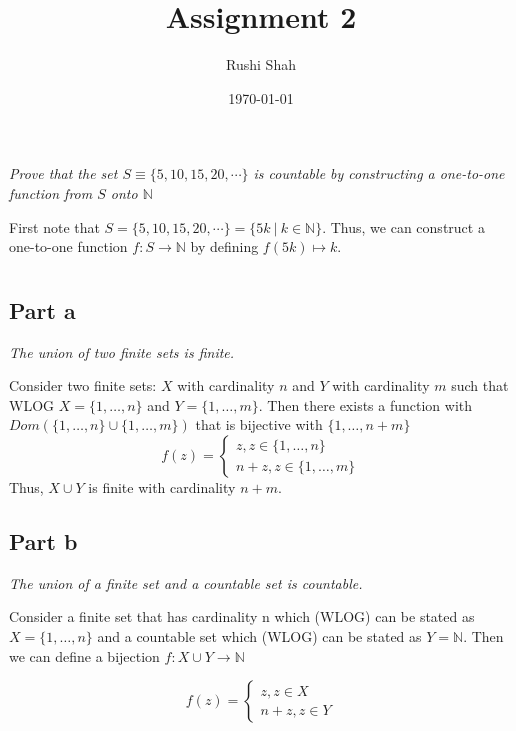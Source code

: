 \documentclass[]{article}
\author{Rushi Shah}
\date{\today}
\title{Assignment 2}
\newcommand{\naturals}{\mathbb{N}}
\begin{document}
	\maketitle



	\section{}
		\textit{Prove that the set $S \equiv \{5, 10, 15, 20, \cdots\}$ is countable by constructing a one-to-one function from $S$ onto $\naturals$}

			First note that $S = \{5, 10, 15, 20, \cdots\} = \{5k\ |\ k \in \naturals\}$. Thus, we can construct a one-to-one function $f : S \to \naturals$ by defining $f(5k) \mapsto k$. 


	\section{}
		\subsection*{Part a}
			\emph{The union of two finite sets is finite.}

			Consider two finite sets: $X$ with cardinality $n$ and $Y$ with cardinality $m$ such that WLOG $X = \{1,\ldots,n\}$ and $Y = \{1,\ldots,m\}$. Then there exists a function with $Dom(\{1,\ldots,n\} \cup \{1,\ldots,m\})$ that is bijective with $\{1, \ldots, n + m\}$
			\[f(z) = \begin{cases}
				z, z \in \{1,\ldots,n\} \\
				n + z, z \in \{1,\ldots,m\}
			\end{cases}\]
			Thus, $X \cup Y$ is finite with cardinality $n + m$. 
		\subsection*{Part b}
			\emph{The union of a finite set and a countable set is countable.}

			Consider a finite set that has cardinality n which (WLOG) can be stated as $X = \{1, \ldots, n\}$ and a countable set which (WLOG) can be stated as $Y = \naturals$. Then we can define a bijection $f : X \cup Y \to \naturals$

			\[f(z) = \begin{cases}
				z, z \in X \\
				n + z, z \in Y
			\end{cases}\]
\end{document}
